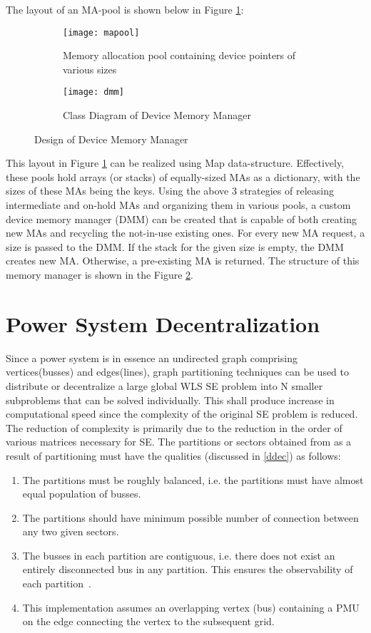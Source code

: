 \documentclass[thesis.tex]{subfiles}
\begin{document}
The layout of an MA-pool is shown below in Figure \ref{fig:mapool}:

\begin{figure}[H]
	\begin{subfigure}{.4\textwidth}
		\centering
		\texttt{[image: mapool]}
		\caption{Memory allocation pool containing device pointers of various sizes}
		\label{fig:mapool}
	\end{subfigure}%
	\begin{subfigure}{.7\textwidth}
		\centering
		\texttt{[image: dmm]}
		\caption{Class Diagram of Device Memory Manager}
		\label{fig:dmm}
	\end{subfigure}
	\caption{Design of Device Memory Manager}
	\label{fig:mapooldmm}
\end{figure}

This layout in Figure \ref{fig:mapool} can be realized using Map data-structure. Effectively, these pools hold arrays (or stacks) of equally-sized MAs as a dictionary, with the sizes of these MAs being the keys. 
Using the above 3 strategies of releasing intermediate and on-hold MAs and organizing them in various pools, a custom device memory manager (DMM) can be created that is capable of both creating new MAs and recycling the not-in-use existing ones. For every new MA request, a size is passed to the DMM. If the stack for the given size is empty, the DMM creates new MA. Otherwise, a pre-existing MA is returned. The structure of this memory manager is shown in the Figure \ref{fig:dmm}.

\section{Power System Decentralization}\label{psdec}
Since a power system is in essence an undirected graph comprising vertices(busses) and edges(lines), graph partitioning techniques can be used to distribute or decentralize a large global WLS SE problem into N smaller subproblems that can be solved individually. This shall produce increase in computational speed since the complexity of the original SE problem is reduced. The reduction of complexity is primarily due to the reduction in the order of various matrices necessary for SE. The partitions or sectors obtained from as a result of partitioning must have the qualities (discussed in \ref{ddec}) as follows:
\begin{enumerate}
	\item The partitions must be roughly balanced, i.e. the partitions must have almost equal population of busses.
	\item The partitions should have minimum possible number of connection between any two given sectors.
	\item The busses in each partition are contiguous, i.e. there does not exist an entirely disconnected bus in any partition. This ensures the observability of each partition~\cite{Xiong}.
	\item This implementation assumes an overlapping vertex (bus) containing a PMU on the edge connecting the vertex to the subsequent grid. 
\end{enumerate}
\end{document}
